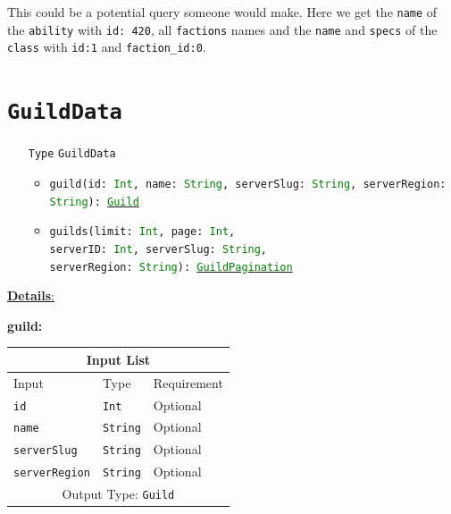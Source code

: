 \documentclass[10pt, a4paper]{memoir}
\numberwithin{equation}{section}
\theoremstyle{plain}
\theoremstyle{defp}
\theoremstyle{dotless}
\theoremstyle{definition}
\theoremstyle{dotless}
\theoremstyle{dotless}
\theoremstyle{defp}
\theoremstyle{defp}
\theoremstyle{be}          %
\theoremstyle{defp}
\newcommand\ttt[1]{\texttt{#1}}
\newcommand\type[1]{\ttt{\textcolor{green}{#1}}}
\begin{document}
This could be a potential query someone would make. Here we get the \ttt{name} of the \ttt{ability} with \ttt{id: 420}, all \ttt{factions} names and the \ttt{name} and \ttt{specs} of the \ttt{class} with \ttt{id:1} and \ttt{faction\_id:0}.
\newpage



\section{\ttt{GuildData}}\label{sec:GuildData}

\begin{itemize}[noitemsep,topsep=1pt]
\item[\ttt{Type}] \ttt{GuildData}
\begin{itemize}[itemsep=1pt,topsep=1pt]
\item \ttt{guild(id: \type{Int}, name: \type{String}, serverSlug: \type{String}, serverRegion: \type{String}): \hyperref[sec:Guild]{\type{Guild}}}
\item \ttt{guilds(limit: \type{Int}, page: \type{Int}, \\serverID: \type{Int}, serverSlug: \type{String}, \\serverRegion: \type{String}): \hyperref[sec:guildpagination]{\type{GuildPagination}}}
\end{itemize}
\end{itemize}

\underline{\textbf{Details}:}

\textbf{guild:}

\begin{table}[h!]
	\centering
	\begin{tabular}{ |p{4.2cm}|p{6cm}|p{3cm}|  }
		\hline
		\multicolumn{3}{|c|}{Input List} \\
		\hline
		Input & Type & Requirement\\
		\hline
		\ttt{id} & \ttt{Int} & Optional\\
		\ttt{name} & \ttt{String} & Optional\\
		\ttt{serverSlug} & \ttt{String} & Optional\\
		\ttt{serverRegion} & \ttt{String} & Optional\\
		\hline
		\multicolumn{3}{|c|}{Output Type: \ttt{Guild}} \\
		\hline
	\end{tabular}
\end{table}
\end{document}

